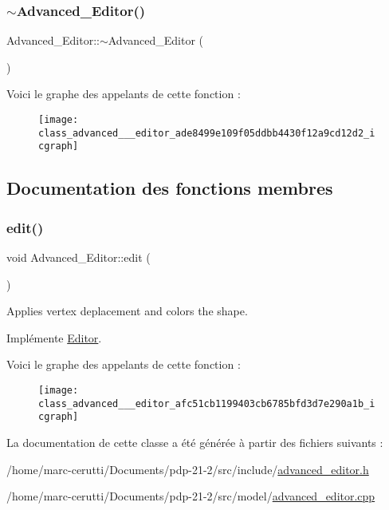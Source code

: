 \subsubsection{\texorpdfstring{$\sim$\+Advanced\+\_\+\+Editor()}{~Advanced\_Editor()}}
{\footnotesize\ttfamily Advanced\+\_\+\+Editor\+::$\sim$\+Advanced\+\_\+\+Editor (\begin{DoxyParamCaption}{ }\end{DoxyParamCaption})}

Voici le graphe des appelants de cette fonction \+:\nopagebreak
\begin{figure}[H]
\begin{center}
\leavevmode
\texttt{[image: class\_advanced\_\_\_editor\_ade8499e109f05ddbb4430f12a9cd12d2\_icgraph]}
\end{center}
\end{figure}


\subsection{Documentation des fonctions membres}
\mbox{\label{class_advanced___editor_afc51cb1199403cb6785bfd3d7e290a1b}} 
\subsubsection{\texorpdfstring{edit()}{edit()}}
{\footnotesize\ttfamily void Advanced\+\_\+\+Editor\+::edit (\begin{DoxyParamCaption}{ }\end{DoxyParamCaption})\hspace{0.3cm}{\ttfamily [virtual]}}



Applies vertex deplacement and colors the shape. 



Implémente \hyperlink{class_editor_abca97ba11536c494a0c26bac77917792}{Editor}.

Voici le graphe des appelants de cette fonction \+:\nopagebreak
\begin{figure}[H]
\begin{center}
\leavevmode
\texttt{[image: class\_advanced\_\_\_editor\_afc51cb1199403cb6785bfd3d7e290a1b\_icgraph]}
\end{center}
\end{figure}


La documentation de cette classe a été générée à partir des fichiers suivants \+:\begin{DoxyCompactItemize}
\item 
/home/marc-\/cerutti/\+Documents/pdp-\/21-\/2/src/include/\hyperlink{advanced__editor_8h}{advanced\+\_\+editor.\+h}\item 
/home/marc-\/cerutti/\+Documents/pdp-\/21-\/2/src/model/\hyperlink{advanced__editor_8cpp}{advanced\+\_\+editor.\+cpp}\end{DoxyCompactItemize}
